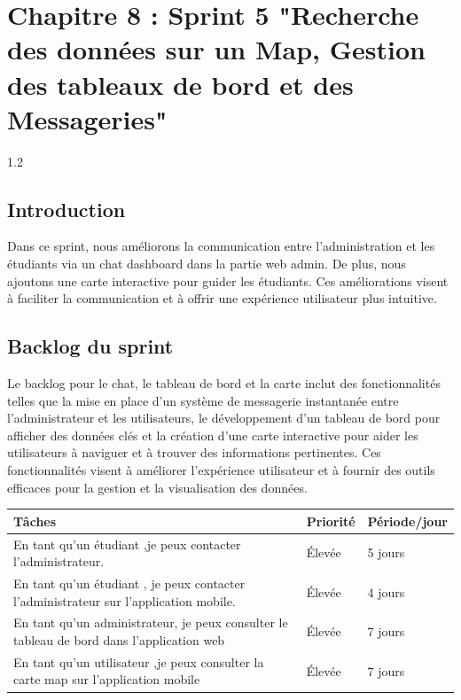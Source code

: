 \chapter{ Chapitre 8 : Sprint 5 "Recherche des données sur un Map, \centering Gestion des tableaux de bord et des Messageries"}
\begin{spacing}{1.2}
\minitoc
\thispagestyle{MyStyle}
\end{spacing}
\newpage
\begin{sloppypar} 

\section{Introduction}
\vspace{-4mm}
Dans ce sprint, nous améliorons la communication entre l'administration et les étudiants via un chat dashboard dans la partie web admin. De plus, nous ajoutons une carte interactive pour guider les étudiants. Ces améliorations visent à faciliter la communication et à offrir une expérience utilisateur plus intuitive. 
\vspace{-8mm}

\section{Backlog du sprint}
\vspace{-4mm}
Le backlog pour le chat, le tableau de bord et la carte inclut des fonctionnalités telles que la mise en place d'un système de messagerie instantanée entre l'administrateur et les utilisateurs, le développement d'un tableau de bord pour afficher des données clés et la création d'une carte interactive pour aider les utilisateurs à naviguer et à trouver des informations pertinentes. Ces fonctionnalités visent à améliorer l'expérience utilisateur et à fournir des outils efficaces pour la gestion et la visualisation des données.

\begin{table}[h]
\centering
\begin{tabular}{|p{9cm}|p{3cm}|p{3cm}|}
\hline
\textbf{ Tâches } & \textbf{ Priorité }& \textbf{Période/jour}  \\
\hline
En tant qu’un étudiant ,je peux contacter l’administrateur.& Élevée  & 5 jours \\
\hline
En tant qu'un étudiant , je peux contacter l’administrateur sur l'application mobile.  & Élevée  & 4 jours  \\
\hline
En tant qu’un administrateur, je peux consulter le tableau de bord dans l’application web & Élevée  & 7 jours  \\
\hline
En tant qu’un utilisateur ,je peux consulter la carte map sur l'application mobile  & Élevée  & 7 jours  \\
\hline


\end{tabular}
\end{table}
\end{sloppypar}
